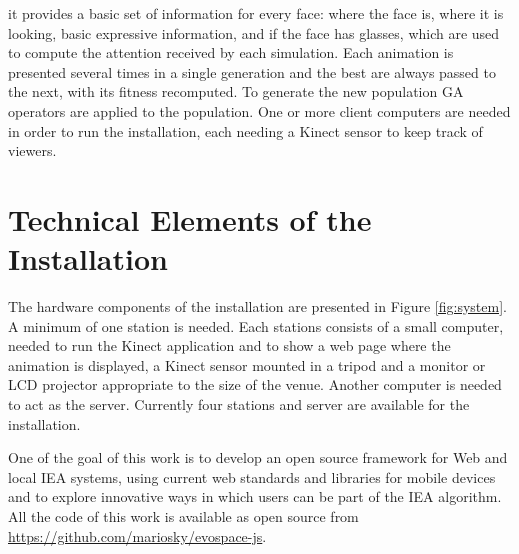 \documentclass[letterpaper]{article}
\begin{document}
it provides a basic set of information for every face: where the face is, where it is looking, 
basic expressive information, and if the face has glasses, which are used to compute the attention received by each simulation. Each animation is 
presented several times in a single generation and the best are always passed to the next, with its fitness recomputed. To generate the new population GA operators
are applied to the population. One or more client computers are needed in order to run the 
installation, each needing a Kinect sensor to keep track of viewers. 
\section{Technical Elements of the Installation}
The hardware components of the installation are presented in Figure \ref{fig:system}. A
minimum of one station is needed. Each stations consists of a small computer, needed 
to run the Kinect application and to show a web page where the animation is displayed, 
a Kinect sensor mounted in a tripod and a monitor or LCD projector appropriate to the
size of the venue. Another computer is needed to act as the server. Currently four stations
and server are available for the installation.  

One of the  goal of this work is to develop an open source framework for Web and local
IEA systems, using current web standards and libraries for mobile devices and to explore 
innovative ways in which users can be part of the IEA algorithm. All the code of this work
is available as open source from \url{https://github.com/mariosky/evospace-js}. 















\end{document}
